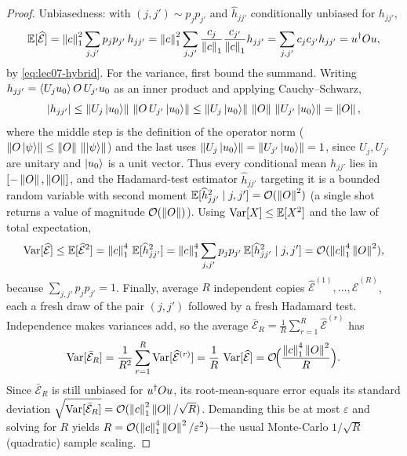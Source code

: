 \begin{proof}
Unbiasedness: with $(j,j')\sim p_jp_{j'}$ and $\widehat h_{jj'}$ conditionally
unbiased for $h_{jj'}$,
\[
  \mathbb{E}[\widehat{\mathcal E}]
  =\left\lVert c \right\rVert_1^2\sum_{j,j'}p_j p_{j'}\,h_{jj'}
  =\left\lVert c \right\rVert_1^2\sum_{j,j'}\frac{c_j}{\left\lVert c \right\rVert_1}\frac{c_{j'}}{\left\lVert c \right\rVert_1}h_{jj'}
  =\sum_{j,j'}c_j c_{j'}h_{jj'}
  =u^{\dagger} Ou,
\]
by \eqref{eq:lec07-hybrid}. For the variance, first bound the summand. Writing
$h_{jj'}=\braket{U_j u_0}{O\,U_{j'}u_0}$ as an inner product and applying
Cauchy--Schwarz,
\[
  \left\lvert h_{jj'} \right\rvert\le\left\lVert U_j\ket{u_0} \right\rVert\,\left\lVert O\,U_{j'}\ket{u_0} \right\rVert
    \le\left\lVert U_j\ket{u_0} \right\rVert\,\left\lVert O \right\rVert\,\left\lVert U_{j'}\ket{u_0} \right\rVert=\left\lVert O \right\rVert,
\]
where the middle step is the definition of the operator norm
($\left\lVert O\ket\psi \right\rVert\le\left\lVert O \right\rVert\,\left\lVert \ket\psi \right\rVert$) and the last uses
$\left\lVert U_j\ket{u_0} \right\rVert=\left\lVert U_{j'}\ket{u_0} \right\rVert=1$, since $U_j,U_{j'}$ are unitary and
$\ket{u_0}$ is a unit vector. Thus every conditional mean $h_{jj'}$ lies in
$[-\left\lVert O \right\rVert,\left\lVert O \right\rVert]$, and the Hadamard-test estimator $\widehat h_{jj'}$ targeting it is
a bounded random variable with second moment $\mathbb{E}[\widehat h_{jj'}^2\mid j,j']
=\mathcal{O}(\left\lVert O \right\rVert^2)$ (a single shot returns a value of magnitude $\mathcal{O}(\left\lVert O \right\rVert)$). Using
$\operatorname{Var}[X]\le\mathbb{E}[X^2]$ and the law of total expectation,
\[
  \operatorname{Var}[\widehat{\mathcal E}]\le\mathbb{E}[\widehat{\mathcal E}^2]
  =\left\lVert c \right\rVert_1^4\,\mathbb{E}[\widehat h_{jj'}^2]
  =\left\lVert c \right\rVert_1^4\sum_{j,j'}p_j p_{j'}\,\mathbb{E}[\widehat h_{jj'}^2\mid j,j']
  =\mathcal{O}(\left\lVert c \right\rVert_1^4\left\lVert O \right\rVert^2),
\]
because $\sum_{j,j'}p_j p_{j'}=1$. Finally, average $R$ independent copies
$\widehat{\mathcal E}^{(1)},\dots,\widehat{\mathcal E}^{(R)}$, each a fresh draw of the
pair $(j,j')$ followed by a fresh Hadamard test. Independence makes variances add, so the
average $\bar{\mathcal E}_R=\tfrac1R\sum_{r=1}^{R}\widehat{\mathcal E}^{(r)}$ has
\[
  \operatorname{Var}[\bar{\mathcal E}_R]=\frac1{R^2}\sum_{r=1}^{R}\operatorname{Var}[\widehat{\mathcal E}^{(r)}]
   =\frac1R\,\operatorname{Var}[\widehat{\mathcal E}]
   =\mathcal{O}\!\Bigl(\frac{\left\lVert c \right\rVert_1^4\left\lVert O \right\rVert^2}{R}\Bigr).
\]
Since $\bar{\mathcal E}_R$ is still unbiased for $u^{\dagger} Ou$, its root-mean-square error
equals its standard deviation $\sqrt{\operatorname{Var}[\bar{\mathcal E}_R]}
=\mathcal{O}(\left\lVert c \right\rVert_1^2\left\lVert O \right\rVert/\sqrt R)$. Demanding this be at most $\varepsilon$ and solving
for $R$ yields $R=\mathcal{O}(\left\lVert c \right\rVert_1^4\left\lVert O \right\rVert^2/\varepsilon^2)$---the usual Monte-Carlo
$1/\sqrt R$ (quadratic) sample scaling.
\end{proof}

